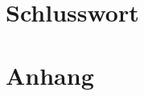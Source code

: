 \documentclass[12pt]{article} %
\begin{document}
\section{Schlusswort} \label{cap:schlusswort}

\newpage


\newpage


\newpage


\newpage

\section{Anhang}




\end{document}

